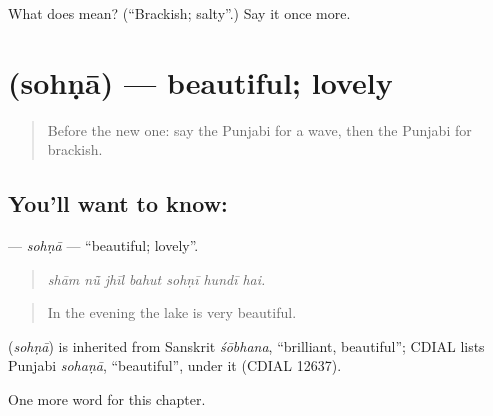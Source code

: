 \begin{tcolorbox}[breakable,colback=teal!4,colframe=teal!35!black,title={Before you move on}]
What does  mean? (\textquotedblleft{}Brackish; salty\textquotedblright{}.) Say it once more.
\end{tcolorbox}
\section[\texorpdfstring{\pa{ਸੋਹਣਾ} (sohṇā)}{ਸੋਹਣਾ (sohṇā)}]{ (sohṇā) — beautiful; lovely}

\label{lesson:PA-C299-sohna}



\begin{quote}
Before the new one: say the Punjabi for a wave, then the Punjabi for brackish.
\end{quote}

\subsection*{You'll want to know: }
\textbf{} — \emph{sohṇā} — \textquotedblleft{}beautiful; lovely\textquotedblright{}.

\begin{quote}
      
\end{quote}

\begin{quote}
\emph{shām nū̃ jhīl bahut sohṇī hundī hai.}
\end{quote}

\begin{quote}
In the evening the lake is very beautiful.
\end{quote}

\begin{cousinweb}
\textbf{} (\emph{sohṇā}) is inherited from Sanskrit \emph{śōbhana}, \textquotedblleft{}brilliant, beautiful\textquotedblright{}; CDIAL lists Punjabi \emph{sohaṇā}, \textquotedblleft{}beautiful\textquotedblright{}, under it (CDIAL 12637).
\end{cousinweb}

\begin{grammarlens}[title={What you've built}]
One more word for this chapter.
\end{grammarlens}

